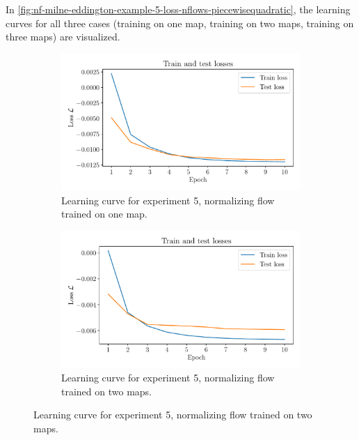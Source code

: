 \documentclass[a4paper,12pt]{report}
\begin{document}
In \cref{fig:nf-milne-eddington-example-5-loss-nflows-piecewisequadratic}, the learning curves for all three cases (training on one map, training on two maps, training on three maps) are visualized.
\begin{figure}[h]
\centering
\begin{subfigure}[t]{0.32\textwidth}
    \centering
    \includegraphics[width=\textwidth]{figures/nf-milne-eddington-example-5-loss-1train-nflows-piecewisequadratic.pdf}
    \caption{Learning curve for experiment 5, normalizing flow trained on one map.}
    \label{fig:nf-milne-eddington-example-5-loss-1train-nflows-piecewisequadratic}
\end{subfigure}
\hfill
\begin{subfigure}[t]{0.32\textwidth}
    \centering
    \includegraphics[width=\textwidth]{figures/nf-milne-eddington-example-5-loss-2train-nflows-piecewisequadratic.pdf}
    \caption{Learning curve for experiment 5, normalizing flow trained on two maps.}
    \label{fig:nf-milne-eddington-example-5-loss-2train-nflows-piecewisequadratic}
\end{subfigure}

\end{figure}
\end{document}
